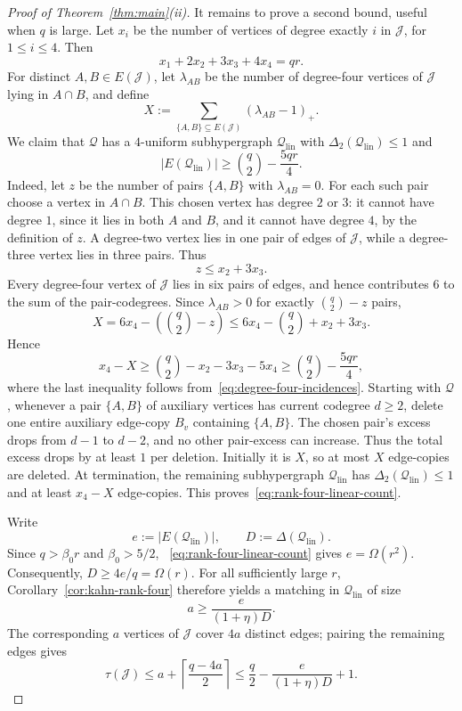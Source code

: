 \documentclass[11pt]{amsart}
\theoremstyle{remark}
\newcommand{\cJ}{\mathcal J}
\newcommand{\cQ}{\mathcal Q}
\newcommand{\cQlin}{\mathcal Q_{\mathrm{lin}}}
\newcommand{\ta}{\tau}
\newcommand{\Del}{\Delta}
\newcommand{\DelTwo}{\Delta_2}
\begin{document}
\begin{proof}[Proof of Theorem~\ref{thm:main}(ii)]
It remains to prove a second bound, useful when $q$ is large.  Let $x_i$ be
the number of vertices of degree exactly $i$ in $\cJ$, for $1\le i\le 4$.
Then
\begin{equation}\label{eq:degree-four-incidences}
  x_1+2x_2+3x_3+4x_4=qr.
\end{equation}
For distinct $A,B\in E(\cJ)$, let $\lambda_{AB}$ be the number of
degree-four vertices of $\cJ$ lying in $A\cap B$, and define
\[
  X:=\sum_{\{A,B\}\subseteq E(\cJ)}(\lambda_{AB}-1)_+.
\]
We claim that $\cQ$ has a $4$-uniform subhypergraph $\cQlin$ with
$\DelTwo(\cQlin)\le 1$ and
\begin{equation}\label{eq:rank-four-linear-count}
  |E(\cQlin)|\ge \binom q2-\frac{5qr}{4}.
\end{equation}
Indeed, let $z$ be the number of pairs $\{A,B\}$ with $\lambda_{AB}=0$.
For each such pair choose a vertex in $A\cap B$.  This chosen vertex has
degree $2$ or $3$: it cannot have degree $1$, since it lies in both $A$ and
$B$, and it cannot have degree $4$, by the definition of $z$.  A degree-two
vertex lies in one pair of edges of $\cJ$, while a degree-three vertex lies in
three pairs.  Thus
\[
  z\le x_2+3x_3.
\]
Every degree-four vertex of $\cJ$ lies in six pairs of edges, and hence
contributes $6$ to the sum of the pair-codegrees.  Since $\lambda_{AB}>0$
for exactly $\binom q2-z$ pairs,
\[
  X
  =6x_4-\left(\binom q2-z\right)
  \le 6x_4-\binom q2+x_2+3x_3.
\]
Hence
\[
  x_4-X\ge \binom q2-x_2-3x_3-5x_4
  \ge \binom q2-\frac{5qr}{4},
\]
where the last inequality follows from~\eqref{eq:degree-four-incidences}.
Starting with $\cQ$, whenever a pair $\{A,B\}$ of auxiliary vertices has
current codegree $d\ge2$, delete one entire auxiliary edge-copy $B_v$
containing $\{A,B\}$.  The chosen pair's excess drops from $d-1$ to $d-2$,
and no other pair-excess can increase.  Thus the total excess drops by at
least $1$ per deletion.  Initially it is $X$, so at most $X$ edge-copies are
deleted.  At termination, the remaining subhypergraph $\cQlin$ has
$\DelTwo(\cQlin)\le1$ and at least $x_4-X$ edge-copies.  This
proves~\eqref{eq:rank-four-linear-count}.

Write
\[
  e:=|E(\cQlin)|,\qquad D:=\Del(\cQlin).
\]
Since $q>\beta_0r$ and $\beta_0>5/2$,
~\eqref{eq:rank-four-linear-count} gives $e=\Omega(r^2)$.
Consequently, $D\ge 4e/q=\Omega(r)$.  For all sufficiently large $r$,
Corollary~\ref{cor:kahn-rank-four} therefore yields a matching in $\cQlin$
of size
\[
  a\ge \frac{e}{(1+\eta)D}.
\]
The corresponding $a$ vertices of $\cJ$ cover $4a$ distinct edges; pairing
the remaining edges gives
\[
  \ta(\cJ)
  \le a+\left\lceil\frac{q-4a}{2}\right\rceil
  \le \frac q2-\frac{e}{(1+\eta)D}+1.
\]


\end{proof}
\end{document}
